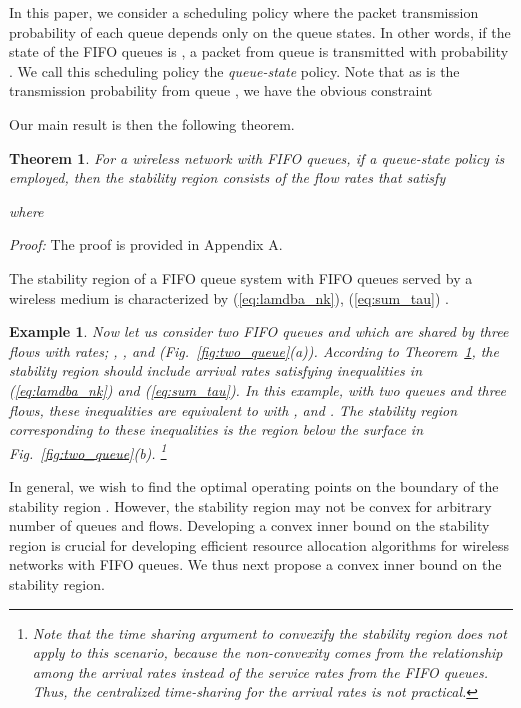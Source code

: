\documentclass[conference]{IEEEtran}
\newtheorem{theorem}{Theorem}
\newtheorem{example}{Example}
\begin{document}
In this paper, we consider a scheduling policy where the packet transmission probability of each queue depends only on the queue states. In other words, if the state of the FIFO queues is , a packet from queue  is transmitted with probability . We call this scheduling policy the {\em queue-state} policy.
Note that as     is the transmission probability from queue , we have the obvious constraint
 
Our main result is then the following theorem.
\begin{theorem} \label{theorem2}
For a wireless network with  FIFO queues, if a queue-state policy  is employed, then the stability region consists of the flow rates that satisfy
 
where 

\end{theorem}
{\em Proof:} The proof is provided in Appendix A. \hfill 



The stability region of a FIFO queue system with  FIFO queues served by a wireless medium is characterized by    (\ref{eq:lamdba_nk}), (\ref{eq:sum_tau})                 .


\begin{example}
Now let us consider two FIFO queues  and  which are shared by three flows with rates; , , and  (Fig.~\ref{fig:two_queue}(a)). According to Theorem~\ref{theorem2}, the stability region  should include arrival rates satisfying inequalities in (\ref{eq:lamdba_nk}) and (\ref{eq:sum_tau}). In this example, with two queues and three flows, these inequalities are equivalent to
 with    , and   . The stability region corresponding to these inequalities is the region below the surface  in Fig.~\ref{fig:two_queue}(b). \footnote{Note that the time sharing argument to convexify the stability region does not apply to this scenario, because the non-convexity comes from the relationship among the arrival rates instead of the service rates from the FIFO queues. Thus, the centralized time-sharing for the arrival rates is not practical.}
\hfill 
\end{example}

In general, we wish to find the optimal operating points on the boundary of the stability region . However, the stability region may not be convex for arbitrary number of queues and flows. Developing a convex inner bound on the stability region is crucial for developing efficient resource allocation algorithms for wireless networks with FIFO queues. We thus next propose a convex inner bound on the stability region.
\end{document}

